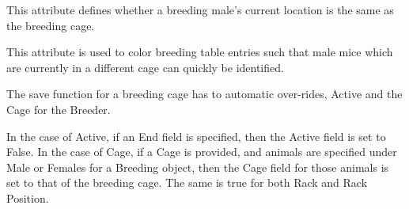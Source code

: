 \documentclass[letterpaper,10pt,english]{sphinxmanual}
\begin{document}
\begin{fulllineitems}

\begin{fulllineitems}
\label{api:mousedb.animal.models.Breeding.get_genotype_display}
\end{fulllineitems}


\begin{fulllineitems}
\label{api:mousedb.animal.models.Breeding.male_breeding_location_type}
This attribute defines whether a breeding male's current location is the same as the breeding cage.

This attribute is used to color breeding table entries such that male mice which are currently in a different cage can quickly be identified.

\end{fulllineitems}


\begin{fulllineitems}
\label{api:mousedb.animal.models.Breeding.objects}
\end{fulllineitems}


\begin{fulllineitems}
\label{api:mousedb.animal.models.Breeding.plugevents_set}
\end{fulllineitems}


\begin{fulllineitems}
\label{api:mousedb.animal.models.Breeding.save}
The save function for a breeding cage has to automatic over-rides, Active and the Cage for the Breeder.

In the case of Active, if an End field is specified, then the Active field is set to False.
In the case of Cage, if a Cage is provided, and animals are specified under Male or Females for a Breeding object, then the Cage field for those animals is set to that of the breeding cage.  The same is true for both Rack and Rack Position.


\end{fulllineitems}
\end{fulllineitems}
\end{document}
